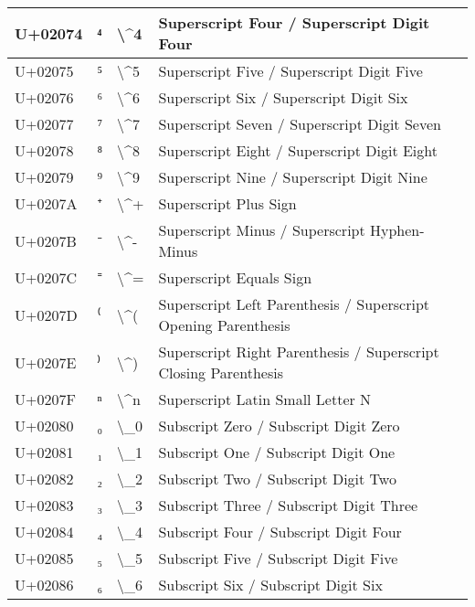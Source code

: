 \begin{table}[h]
\begin{tabulary}{\linewidth}{|L|L|L|L|}
\hline
U+02074 & ⁴ & {\textbackslash}{\textasciicircum}4 & Superscript Four / Superscript Digit Four \\
\hline
U+02075 & ⁵ & {\textbackslash}{\textasciicircum}5 & Superscript Five / Superscript Digit Five \\
\hline
U+02076 & ⁶ & {\textbackslash}{\textasciicircum}6 & Superscript Six / Superscript Digit Six \\
\hline
U+02077 & ⁷ & {\textbackslash}{\textasciicircum}7 & Superscript Seven / Superscript Digit Seven \\
\hline
U+02078 & ⁸ & {\textbackslash}{\textasciicircum}8 & Superscript Eight / Superscript Digit Eight \\
\hline
U+02079 & ⁹ & {\textbackslash}{\textasciicircum}9 & Superscript Nine / Superscript Digit Nine \\
\hline
U+0207A & ⁺ & {\textbackslash}{\textasciicircum}+ & Superscript Plus Sign \\
\hline
U+0207B & ⁻ & {\textbackslash}{\textasciicircum}- & Superscript Minus / Superscript Hyphen-Minus \\
\hline
U+0207C & ⁼ & {\textbackslash}{\textasciicircum}= & Superscript Equals Sign \\
\hline
U+0207D & ⁽ & {\textbackslash}{\textasciicircum}( & Superscript Left Parenthesis / Superscript Opening Parenthesis \\
\hline
U+0207E & ⁾ & {\textbackslash}{\textasciicircum}) & Superscript Right Parenthesis / Superscript Closing Parenthesis \\
\hline
U+0207F & ⁿ & {\textbackslash}{\textasciicircum}n & Superscript Latin Small Letter N \\
\hline
U+02080 & ₀ & {\textbackslash}\_0 & Subscript Zero / Subscript Digit Zero \\
\hline
U+02081 & ₁ & {\textbackslash}\_1 & Subscript One / Subscript Digit One \\
\hline
U+02082 & ₂ & {\textbackslash}\_2 & Subscript Two / Subscript Digit Two \\
\hline
U+02083 & ₃ & {\textbackslash}\_3 & Subscript Three / Subscript Digit Three \\
\hline
U+02084 & ₄ & {\textbackslash}\_4 & Subscript Four / Subscript Digit Four \\
\hline
U+02085 & ₅ & {\textbackslash}\_5 & Subscript Five / Subscript Digit Five \\
\hline
U+02086 & ₆ & {\textbackslash}\_6 & Subscript Six / Subscript Digit Six \\
\hline

\end{tabulary}
\end{table}
